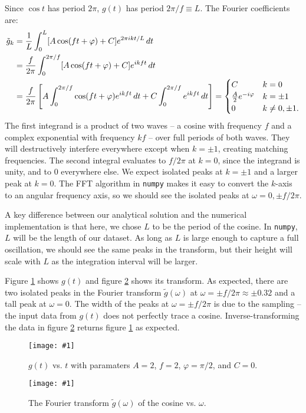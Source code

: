 \documentclass{article}
\theoremstyle{definition}
\newcommand{\cc}{\texttt}
\newcommand{\plop}[2]{
    \begin{figure}\centering
        \texttt{[image: \#1]}
        \caption{\label{#1}#2}
    \end{figure}
}
\begin{document}
Since $\cos t$ has period $2\pi$, $g(t)$ has period $2\pi/f \equiv L$.
The Fourier coefficients are:
\begin{align*}
\tilde g_k
&= {1 \over L} \int_0^L [A \cos(ft + \varphi) + C]
e^{2\pi i k t / L} \, dt \\
&= {f \over 2\pi} \int_0^{2\pi/f} [A \cos(ft + \varphi) + C]
e^{i k f t} \, dt \\
&= {f \over 2\pi}
\left[
A \int_0^{2\pi/f} \cos(ft + \varphi)
e^{i k f t} \, dt
+ C  \int_0^{2\pi/f}
e^{i k f t} \, dt
\right]
=
\begin{cases}
C & k = 0 \\
{A \over 2} e^{-i\varphi} & k = \pm 1 \\
0 & k \not= 0, \pm 1.
\end{cases}
\end{align*}
The first integrand is a product of two waves -- a cosine with
frequency $f$ and a complex exponential with frequency $kf$ --
over full periods of both waves.
They will destructively interfere everywhere except when $k = \pm 1$,
creating matching frequencies.
The second integral evaluates to $f/2\pi$ at $k = 0$, since the integrand
is unity, and to 0 everywhere else.
We expect isolated peaks at $k = \pm 1$ and a larger
peak at $k = 0$. The FFT algorithm in
\cc{numpy} makes it easy to convert the $k$-axis to an angular
frequency axis, so we should see the
isolated peaks at $\omega = 0, \pm f/2\pi$.

A key difference between our analytical solution and the numerical
implementation is that here, we chose $L$ to be the period of the cosine.
In \cc{numpy}, $L$ will be the length of our dataset. As long as $L$
is large enough to capture a full oscillation, we should see the
same peaks in the transform, but their height will scale with $L$ as
the integration interval will be larger.

Figure \ref{g.pdf} shows $g(t)$ and figure \ref{Fg.pdf} shows its
transform.
As expected, there are two isolated peaks in the Fourier transform
$\tilde g(\omega)$ at $\omega = \pm f/2\pi \approx \pm 0.32$ and
a tall peak at $\omega = 0$. The width
of the peaks at $\omega = \pm f/2\pi$
is due to the sampling -- the input data from
$g(t)$ does not perfectly trace a cosine. Inverse-transforming the data
in figure \ref{Fg.pdf} returns figure \ref{g.pdf} as expected.
\plop{g.pdf}{$g(t)$ vs. $t$ with paramaters
$A = 2$, $f = 2$, $\varphi = \pi/2$, and $C = 0$.}
\plop{Fg.pdf}{The Fourier transform $\tilde g(\omega)$ of the cosine
vs. $\omega$.}
\end{document}
